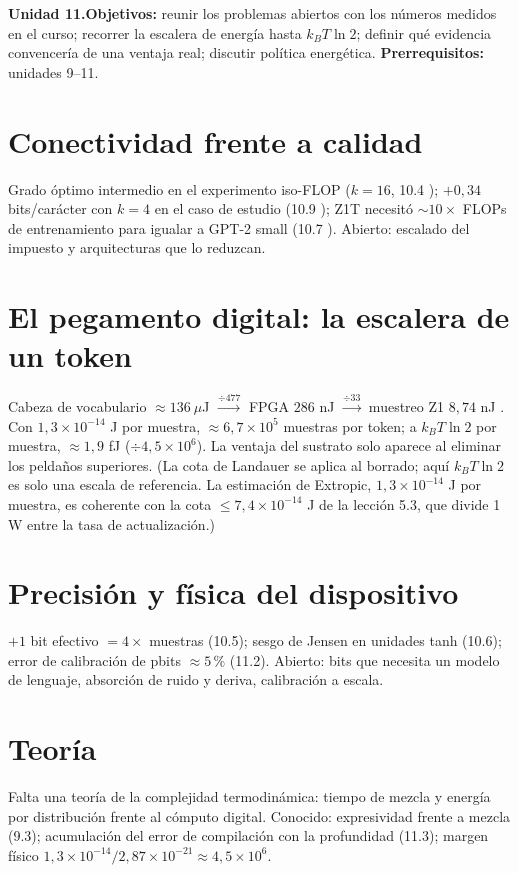 \documentclass[11pt,a4paper]{article}
\begin{document}

\noindent\textbf{Unidad 11.}\quad\textbf{Objetivos:} reunir los problemas abiertos con los números medidos en el curso; recorrer la escalera de energía hasta
$k_BT\ln2$; definir qué evidencia convencería de una ventaja real; discutir política energética.
\textbf{Prerrequisitos:} unidades 9--11.

\section{Conectividad frente a calidad}
Grado óptimo intermedio en el experimento iso-FLOP ($k=16$, 10.4 \evS); $+0{,}34$ bits/carácter con $k=4$ en el caso de estudio (10.9 \evS); Z1T necesitó $\sim10\times$ FLOPs
de entrenamiento para igualar a GPT-2 small (10.7 \evP). Abierto: escalado del impuesto y arquitecturas que lo reduzcan.

\section{El pegamento digital: la escalera de un token}
Cabeza de vocabulario $\approx136\ \mu$J $\xrightarrow{\div477}$ FPGA $286$ nJ $\xrightarrow{\div33}$ muestreo Z1 $8{,}74$ nJ \evP. Con $1{,}3\times10^{-14}$ J por muestra,
$\approx6{,}7\times10^5$ muestras por token; a $k_BT\ln2$ por muestra, $\approx1{,}9$ fJ ($\div4{,}5\times10^6$). La ventaja del sustrato solo aparece al eliminar los peldaños
superiores. (La cota de Landauer se aplica al borrado; aquí $k_BT\ln2$ es solo una escala de referencia. La estimación de Extropic, $1{,}3\times10^{-14}$ J por muestra, es coherente con la cota $\le7{,}4\times10^{-14}$ J de la lección 5.3, que divide 1 W entre la tasa de actualización.)

\section{Precisión y física del dispositivo}
$+1$ bit efectivo $=4\times$ muestras (10.5); sesgo de Jensen en unidades tanh (10.6); error de calibración de pbits $\approx5\,\%$ (11.2). Abierto: bits que necesita un
modelo de lenguaje, absorción de ruido y deriva, calibración a escala.

\section{Teoría}
Falta una teoría de la complejidad termodinámica: tiempo de mezcla y energía por distribución frente al cómputo digital. Conocido: expresividad frente a mezcla (9.3);
acumulación del error de compilación con la profundidad (11.3); margen físico $1{,}3\times10^{-14}/2{,}87\times10^{-21}\approx4{,}5\times10^6$.
\end{document}
